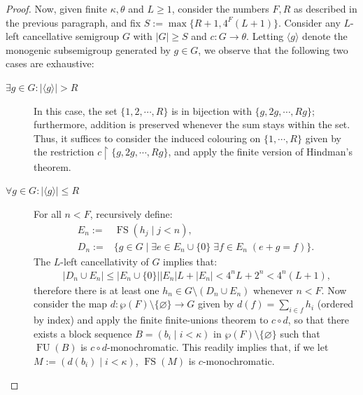 \documentclass[10pt,a4paper]{amsart}
\theoremstyle{definition}
\theoremstyle{remark}
\numberwithin{equation}{section}
\begin{document}
\begin{proof}
    Now, given finite $\kappa, \theta$ and $L\geq1$, consider the numbers $F, R$ as described in the previous paragraph, and fix $S:=\max\{R+1, 4^{F}(L+1)\}$.
    Consider any $L$-left cancellative semigroup $G$ with $|G|\geq S$ and $c:G\longrightarrow\theta$. Letting $\langle g\rangle$ denote the monogenic subsemigroup generated by $g\in G$, we observe that the following two cases are exhaustive:
    \begin{description}
        \item[$\exists g\in G:|\langle g\rangle|>R$]
            In this case, the set $\{1, 2, \cdots, R\}$ is in bijection with $\{g, 2g, \cdots, Rg\}$; furthermore, addition is preserved whenever the sum stays within the set. Thus, it suffices to consider the induced colouring on $\{1,\cdots,R\}$ given by the restriction $c\upharpoonright\{g,2g,\cdots,Rg\}$, and apply the finite version of Hindman's theorem.
        \item[$\forall g\in G:|\langle g\rangle|\leq R$] 
            For all $n<F$, recursively define:
            \begin{align*}
                E_{n}:=&\operatorname{FS}(h_{j}\mid j<n),\\
                D_{n}:=&\{g\in G\mid\exists e\in E_{n}\cup\{0\}\;\exists f\in E_{n}\;(e+g=f)\}.
            \end{align*}
            The $L$-left cancellativity of $G$ implies that:
            \begin{align*}\;
                |D_{n}\cup E_{n}|\leq
                |E_{n}\cup\{0\}||E_n|L+|E_n|<
                4^{n}L+2^{n}<
                4^{n}(L+1),
            \end{align*}
            therefore there is at least one $h_{n}\in G\setminus(D_{n}\cup E_{n})$ whenever $n<F$.
            Now consider the map $d:\wp(F)\setminus\{\varnothing\}\to G$ given by $d(f)=\sum_{i\in f}h_{i}$ (ordered by index) and apply the finite finite-unions theorem to $c\circ d$, so that there exists a block sequence $B=(b_{i}\mid i<\kappa)$ in $\wp(F)\setminus\{\varnothing\}$ such that $\operatorname{FU}(B)$ is $c\circ d$-monochromatic. This readily implies that, if we let $M:=(d(b_{i})\mid i<\kappa)$, $\operatorname{FS}(M)$ is $c$-monochromatic. \qedhere
    \end{description}
\end{proof}


\end{document}
